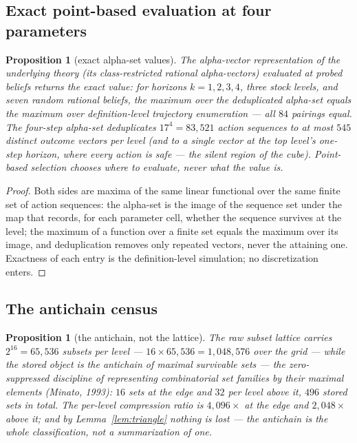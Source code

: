 \documentclass[10pt,twocolumn]{article}
\theoremstyle{plain}
\newtheorem{proposition}[theorem]{Proposition}
\theoremstyle{definition}
\theoremstyle{remark}
\begin{document}
\subsection{Exact point-based evaluation at four parameters}
\label{pbvi}

\begin{proposition}[exact alpha-set values]\label{prop:pbvi}
The alpha-vector representation of the underlying theory (its
class-restricted rational alpha-vectors) evaluated at probed beliefs
returns the exact value: for horizons \(k = 1, 2, 3, 4\), three stock
levels, and seven random rational beliefs, the maximum over the
deduplicated alpha-set equals the maximum over definition-level
trajectory enumeration --- all \(84\) pairings equal. The four-step
alpha-set deduplicates \(17^{4} = 83{,}521\) action sequences to at
most \(545\) distinct outcome vectors per level (and to a single
vector at the top level's one-step horizon, where every action is
safe --- the silent region of the cube). Point-based selection
chooses where to evaluate, never what the value is.
\end{proposition}

\begin{proof}
Both sides are maxima of the same linear functional over the same
finite set of action sequences: the alpha-set is the image of the
sequence set under the map that records, for each parameter cell,
whether the sequence survives at the level; the maximum of a function
over a finite set equals the maximum over its image, and
deduplication removes only repeated vectors, never the attaining one.
Exactness of each entry is the definition-level simulation; no
discretization enters.
\end{proof}

\subsection{The antichain census}\label{census}

\begin{proposition}[the antichain, not the lattice]\label{prop:census}
The raw subset lattice carries \(2^{16} = 65{,}536\) subsets per
level --- \(16 \times 65{,}536 = 1{,}048{,}576\) over the grid ---
while the stored object is the antichain of maximal survivable sets --- the zero-suppressed
discipline of representing combinatorial set families by their maximal
elements (Minato, 1993):
\(16\) sets at the edge and \(32\) per level above it, \(496\) stored
sets in total. The per-level compression ratio is \(4{,}096\times\) at
the edge and \(2{,}048\times\) above it; and by
Lemma~\ref{lem:triangle} nothing is lost --- the antichain is the
whole classification, not a summarization of one.
\end{proposition}
\end{document}
